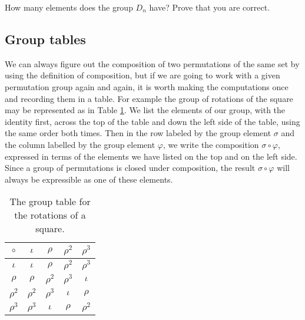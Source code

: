 \bp
\itemei How many elements does the group $D_n$ have? Prove that you are
correct.
\ep

\subsection{Group tables}
We can always figure out the composition of two permutations of the same
set by using the definition of composition, but if we are going to work
with a given permutation group again and again, it is worth making the
computations once and recording them in a table.  For example the group
of rotations of the square may be represented as in Table
\ref{rotationgrouptable}.  We list the elements of our group, with the
identity first, across the top of the table and down the left side of the
table, using the same order both times.  Then in the row labeled by the
group element $\sigma$ and the column labelled by the group element
$\varphi$, we write the composition $\sigma\circ \varphi$, expressed in
terms of the elements we have listed on the top and on the left side. 
Since a group of permutations is closed under composition, the result
$\sigma\circ \varphi$ will always be expressible as one of these elements.


\begin{table}[htb]\caption{The group
table for the rotations of a square.}\label{rotationgrouptable}\smallskip
\begin{center}
\begin{tabular}{|c|c c c c|}
\hline
$\circ$&$\iota$&$\rho$&$\rho^2$&$\rho^3$\\
\hline
$\iota$&$\iota$&$\rho$&$\rho^2$&$\rho^3$\\
$\rho$&$\rho$&$\rho^2$&$\rho^3$&$\iota$\\
$\rho^2$&$\rho^2$&$\rho^3$&$\iota$&$\rho$\\
$\rho^3$&$\rho^3$&$\iota$&$\rho$&$\rho^2$\\
\hline
\end{tabular}
\end{center}  
\end{table}

